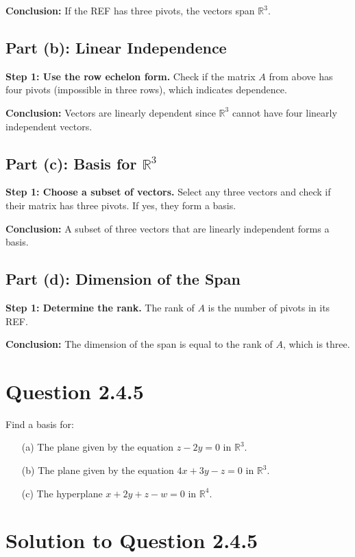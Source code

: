 \documentclass[12pt]{article}
\begin{document}
\textbf{Conclusion:} If the REF has three pivots, the vectors span \( \mathbb{R}^3 \).

\subsection*{Part (b): Linear Independence}
\textbf{Step 1: Use the row echelon form.}
Check if the matrix \(A\) from above has four pivots (impossible in three rows), which indicates dependence.

\textbf{Conclusion:} Vectors are linearly dependent since \( \mathbb{R}^3 \) cannot have four linearly independent vectors.

\subsection*{Part (c): Basis for \( \mathbb{R}^3 \)}
\textbf{Step 1: Choose a subset of vectors.}
Select any three vectors and check if their matrix has three pivots. If yes, they form a basis.

\textbf{Conclusion:} A subset of three vectors that are linearly independent forms a basis.

\subsection*{Part (d): Dimension of the Span}
\textbf{Step 1: Determine the rank.}
The rank of \(A\) is the number of pivots in its REF.

\textbf{Conclusion:} The dimension of the span is equal to the rank of \(A\), which is three.





\newpage
\section*{Question 2.4.5}
Find a basis for:
\begin{itemize}
    \item[(a)] The plane given by the equation \(z - 2y = 0\) in \( \mathbb{R}^3\).
    \item[(b)] The plane given by the equation \(4x + 3y - z = 0\) in \( \mathbb{R}^3\).
    \item[(c)] The hyperplane \(x + 2y + z - w = 0\) in \( \mathbb{R}^4\).
\end{itemize}

\section*{Solution to Question 2.4.5}
\end{document}
